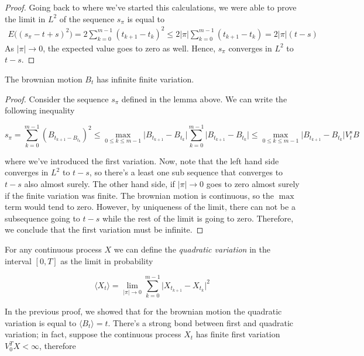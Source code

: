 \begin{proof}
    Going back to where we've started this calculations, we were able to prove the limit in $L^2$ of the sequence $s_{\pi}$ is equal to 
    \begin{gather*}
        E\Big( (s_{\pi} - t+s)^2 \Big) = 2 \sum_{k=0}^{m-1} (t_{k+1}-t_k)^2 \leq 2 \vert \pi \vert \sum_{k=0}^{m-1} (t_{k+1}-t_k) = 2 \vert\pi\vert (t-s)
    \end{gather*}
    As $\vert\pi\vert \to 0$, the expected value goes to zero as well. Hence, $s_\pi$ converges in $L^2$ to $t-s$.
\end{proof}

\begin{proposition}
    The brownian motion $B_t$ has infinite finite variation. 
\end{proposition}
\begin{proof}
    Consider the sequence $s_{\pi}$ defined in the lemma above. We can write the following inequality 

    \begin{equation*}
        s_{\pi} = \sum_{k=0}^{m-1} (B_{t_{k+1}-B_{t_k}})^2 \leq \max_{0 \leq k \leq m-1} \vert B_{t_{k+1}}-B_{t_k} \vert \sum_{k=0}^{m-1} \vert B_{t_{k+1}}-B_{t_k} \vert \leq \max_{0 \leq k \leq m-1} \vert B_{t_{k+1}}-B_{t_k} \vert V_t^s B
    \end{equation*}

where we've introduced the first variation. Now, note that the left hand side converges in $L^2$ to $t-s$, so there's a least one sub sequence that converges to $t-s$ also almost surely. The other hand side, if $\vert \pi \vert \to 0$ goes to zero almost surely if the finite variation was finite. The brownian motion is continuous, so the $\max$ term would tend to zero. However, by uniqueness of the limit, there can not be a subsequence going to $t-s$ while the rest of the limit is going to zero. Therefore, we conclude that the first variation must be infinite.  
\end{proof}

For any continuous process $X$ we can define the \textit{quadratic variation} in the interval $[0,T]$ as the limit in probability

\begin{equation*}
    \langle X_t \rangle = \lim_{\vert \pi \vert \to 0} \sum_{k=0}^{m-1} \vert X_{t_{k+1}}-X_{t_k} \vert^2
\end{equation*}

In the previous proof, we showed that for the brownian motion the quadratic variation is equal to $\langle B_t \rangle = t$. There's a strong bond between first and quadratic variation; in fact, suppose the continuous process $X_t$ has finite first variation $V_0^T X < \infty$, therefore 

